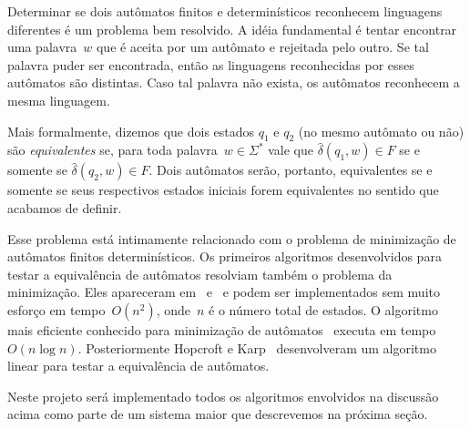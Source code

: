 \documentclass[
	12pt,				%
	openany,
	oneside,
	a4paper,			%
	english,			%
	brazil,				%
	]{abntex2}
\begin{document}
Determinar se dois autômatos finitos e determinísticos reconhecem linguagens diferentes é um problema bem resolvido. A idéia fundamental é tentar encontrar uma palavra~$w$ que é aceita por um autômato e rejeitada pelo outro. Se tal palavra puder ser encontrada, então as linguagens reconhecidas por esses autômatos são distintas. Caso tal palavra não exista, os autômatos reconhecem a mesma linguagem. 

Mais formalmente, dizemos que dois estados $q_1$ e $q_2$ (no mesmo autômato ou não) são \emph{equivalentes} se, para toda palavra~$w \in \Sigma^*$ vale que $\hat{\delta}(q_1, w) \in F$ se e somente se $\hat{\delta}(q_2, w) \in F$. Dois autômatos serão, portanto, equivalentes se e somente se seus respectivos estados iniciais forem equivalentes no sentido que acabamos de definir.

Esse problema está intimamente relacionado com o problema de minimização de autômatos finitos determinísticos. Os primeiros algoritmos desenvolvidos para testar a equivalência de autômatos resolviam também o problema da minimização. Eles apareceram em~\cite{huffman} e~\cite{moore} e podem ser implementados sem muito esforço em tempo~$O(n^2)$, onde~$n$ é o número total de estados. O algoritmo mais eficiente conhecido para minimização de autômatos~\cite{hopcroft} executa em tempo~$O(n \log{n})$. Posteriormente Hopcroft e Karp~\cite{hopcroft_karp} desenvolveram um algoritmo linear para testar a equivalência de autômatos.



Neste projeto será implementado todos os algoritmos envolvidos na discussão acima como parte de um sistema maior que descrevemos na próxima seção.
\end{document}
